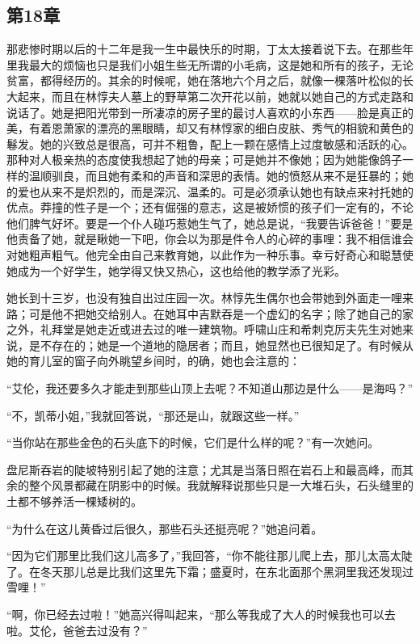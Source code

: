 \subsection{第18章}

\par 那悲惨时期以后的十二年是我一生中最快乐的时期，丁太太接着说下去。在那些年里我最大的烦恼也只是我们小姐生些无所谓的小毛病，这是她和所有的孩子，无论贫富，都得经历的。其余的时候呢，她在落地六个月之后，就像一棵落叶松似的长大起来，而且在林惇夫人墓上的野草第二次开花以前，她就以她自己的方式走路和说话了。她是把阳光带到一所凄凉的房子里的最讨人喜欢的小东西——脸是真正的美，有着恩萧家的漂亮的黑眼睛，却又有林惇家的细白皮肤、秀气的相貌和黄色的鬈发。她的兴致总是很高，可并不粗鲁，配上一颗在感情上过度敏感和活跃的心。那种对人极亲热的态度使我想起了她的母亲；可是她并不像她；因为她能像鸽子一样的温顺驯良，而且她有柔和的声音和深思的表情。她的愤怒从来不是狂暴的；她的爱也从来不是炽烈的，而是深沉、温柔的。可是必须承认她也有缺点来衬托她的优点。莽撞的性子是一个；还有倔强的意志，这是被娇惯的孩子们一定有的，不论他们脾气好坏。要是一个仆人碰巧惹她生气了，她总是说，“我要告诉爸爸！”要是他责备了她，就是瞅她一下吧，你会以为那是件令人的心碎的事哩：我不相信谁会对她粗声粗气。他完全由自己来教育她，以此作为一种乐事。幸亏好奇心和聪慧使她成为一个好学生，她学得又快又热心，这也给他的教学添了光彩。
\par 她长到十三岁，也没有独自出过庄园一次。林惇先生偶尔也会带她到外面走一哩来路；可是他不把她交给别人。在她耳中吉默吞是一个虚幻的名字；除了她自己的家之外，礼拜堂是她走近或进去过的唯一建筑物。呼啸山庄和希刺克厉夫先生对她来说，是不存在的；她是一个道地的隐居者；而且，她显然也已很知足了。有时候从她的育儿室的窗子向外眺望乡间时，的确，她也会注意的：
\par “艾伦，我还要多久才能走到那些山顶上去呢？不知道山那边是什么——是海吗？”
\par “不，凯蒂小姐，”我就回答说，“那还是山，就跟这些一样。”
\par “当你站在那些金色的石头底下的时候，它们是什么样的呢？”有一次她问。
\par 盘尼斯吞岩的陡坡特别引起了她的注意；尤其是当落日照在岩石上和最高峰，而其余的整个风景都藏在阴影中的时候。我就解释说那些只是一大堆石头，石头缝里的土都不够养活一棵矮树的。
\par “为什么在这儿黄昏过后很久，那些石头还挺亮呢？”她追问着。
\par “因为它们那里比我们这儿高多了，”我回答，“你不能往那儿爬上去，那儿太高太陡了。在冬天那儿总是比我们这里先下霜；盛夏时，在东北面那个黑洞里我还发现过雪哩！”
\par “啊，你已经去过啦！”她高兴得叫起来，“那么等我成了大人的时候我也可以去啦。艾伦，爸爸去过没有？”
